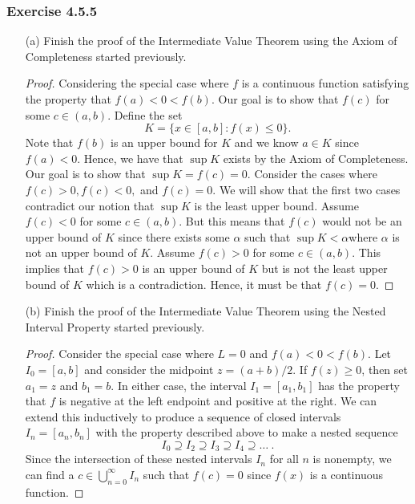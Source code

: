 \subsubsection{Exercise 4.5.5} 
\begin{enumerate}
    \item[(a)] Finish the proof of the Intermediate Value Theorem using the Axiom of Completeness started previously.
        \begin{proof}
        Considering the special case where \( f  \) is a continuous function satisfying the property that \( f(a) < 0 < f(b) \). Our goal is to show that \( f(c) \) for some \( c \in (a,b) \). Define the set 
        \[ K = \{ x \in [a,b] : f(x) \leq 0  \}. \] 
Note that \( f(b)  \) is an upper bound for \(  K \) and we know \( a \in K  \) since \( f(a) < 0  \). Hence, we have that \( \sup K  \) exists by the Axiom of Completeness. Our goal is to show that \( \sup  K = f(c) = 0  \). Consider the cases where \( f(c) > 0 , f(c) < 0,  \) and \( f(c) = 0  \). We will show that the first two cases contradict our notion that \( \sup K  \) is the least upper bound. Assume \( f(c) < 0  \) for some \( c \in (a,b) \). But this means that \( f(c)  \) would not be an upper bound of \(  K \) since there exists some \( \alpha  \) such that \( \sup K < \alpha  \)where \( \alpha  \) is not an upper bound of \( K  \). Assume \( f(c) > 0  \) for some \( c \in (a,b)  \). This implies that \( f(c) > 0  \) is an upper bound of \( K  \) but is not the least upper bound of \( K  \) which is a contradiction. Hence, it must be that \( f(c) = 0  \). 
        \end{proof}
    \item[(b)] Finish the proof of the Intermediate Value Theorem using the Nested Interval Property started previously.
        \begin{proof}
            Consider the special case where \( L = 0  \) and \( f(a) < 0 < f(b)  \). Let \( I_0 = [a,b] \) and consider the midpoint \( z = (a+b) / 2  \). If \( f(z) \geq 0  \), then set \( a_1 = z  \) and \( b_1 = b  \). In either case, the interval \( I_1 = [a_1, b_1 ] \) has the property that \( f  \) is negative at the left endpoint and positive at the right. We can extend this inductively to produce a sequence of closed intervals \( I_n = [a_n, b_n] \) with the property described above to make a nested sequence 
            \[  I_0 \supseteq I_2 \supseteq I_3 \supseteq I_4 \supseteq \dots ~ . \]
            Since the intersection of these nested intervals \( I_n  \) for all \( n \) is nonempty, we can find a \( c \in \bigcup_{n = 0 }^{\infty} I_n \) such that \( f(c) = 0  \) since \( f(x)  \) is a continuous function.
        \end{proof}
\end{enumerate}

